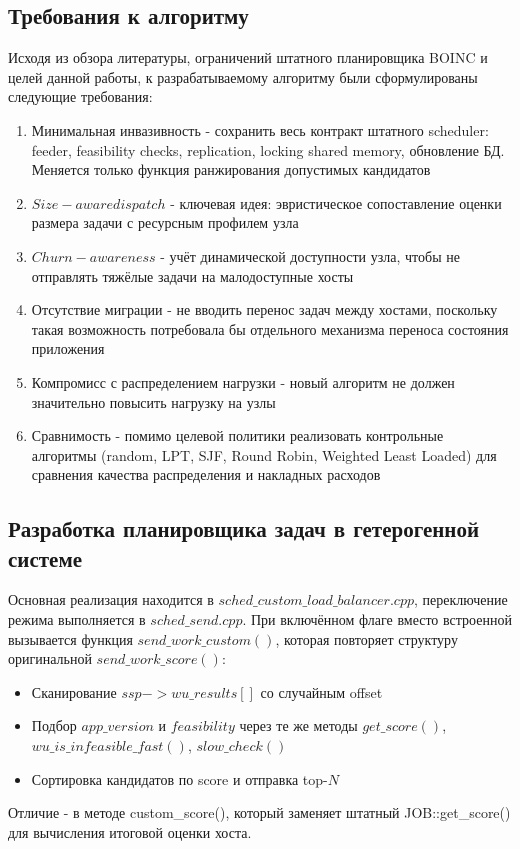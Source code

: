 \documentclass[a4paper,12pt]{extarticle}
\begin{document}
\subsection{Требования к алгоритму}

Исходя из обзора литературы, ограничений штатного планировщика BOINC и целей данной работы, к разрабатываемому алгоритму были сформулированы следующие требования:
\begin{enumerate}
    \item Минимальная инвазивность - сохранить весь контракт штатного scheduler: feeder, feasibility checks, replication, locking shared memory, обновление БД. Меняется только функция ранжирования допустимых кандидатов
    \item $Size-aware dispatch$ - ключевая идея: эвристическое сопоставление оценки размера задачи с ресурсным профилем узла
    \item $Churn-awareness$ - учёт динамической доступности узла, чтобы не отправлять тяжёлые задачи на малодоступные хосты
    \item Отсутствие миграции - не вводить перенос задач между хостами, поскольку такая возможность потребовала бы отдельного механизма переноса состояния приложения
    \item Компромисс с распределением нагрузки - новый алгоритм не должен значительно повысить нагрузку на узлы
    \item Сравнимость - помимо целевой политики реализовать контрольные алгоритмы (random, LPT, SJF, Round Robin, Weighted Least Loaded) для сравнения качества распределения и накладных расходов
\end{enumerate}

\subsection{Разработка планировщика задач в гетерогенной системе}

Основная реализация находится в $sched\_custom\_load\_balancer.cpp$, переключение режима выполняется в $sched\_send.cpp$. При включённом флаге вместо встроенной вызывается функция $send\_work\_custom()$, которая повторяет структуру оригинальной $send\_work\_score()$:
\begin{itemize}
    \item Сканирование $ssp->wu\_results[]$ со случайным offset
    \item Подбор $app\_version$ и $feasibility$ через те же методы $get\_score()$, $wu\_is\_infeasible\_fast()$, $slow\_check()$
    \item Сортировка кандидатов по score и отправка top-$N$
\end{itemize}
Отличие - в методе custom\_score(), который заменяет штатный JOB::get\_score() для вычисления итоговой оценки хоста.
\end{document}
